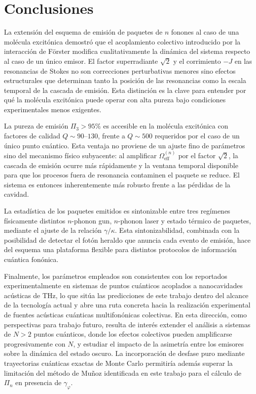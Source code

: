 \chapter{Conclusiones}

La extensión del esquema de emisión de paquetes de $n$ fonones al caso de una molécula excitónica demostró que el acoplamiento colectivo introducido por la interacción de Förster modifica cualitativamente la dinámica del sistema respecto al caso de un único emisor. El factor superradiante $\sqrt{2}$ y el corrimiento $-J$ en las resonancias de Stokes no son correcciones perturbativas menores sino efectos estructurales que determinan tanto la posición de las resonancias como la escala temporal de la cascada de emisión. Esta distinción es la clave para entender por qué la molécula excitónica puede operar con alta pureza bajo condiciones experimentales menos exigentes.

La pureza de emisión $\Pi_3 > 95\%$ es accesible en la molécula excitónica con factores de calidad $Q \sim 90$--$130$, frente a $Q \sim 500$ requeridos por el caso de un único punto cuántico. Esta ventaja no proviene de un ajuste fino de parámetros sino del mecanismo físico subyacente: al amplificar $\Omega_\mathrm{eff}^{(n)}$ por el factor $\sqrt{2}$, la cascada de emisión ocurre más rápidamente y la ventana temporal disponible para que los procesos fuera de resonancia contaminen el paquete se reduce. El sistema es entonces inherentemente más robusto frente a las pérdidas de la cavidad.

La estadística de los paquetes emitidos es sintonizable entre tres regímenes físicamente distintos $n$-phonon gun, $n$-phonon laser y estado térmico de paquetes, mediante el ajuste de la relación $\gamma/\kappa$. Esta sintonizabilidad, combinada con la posibilidad de detectar el fotón heraldo que anuncia cada evento de emisión, hace del esquema una plataforma flexible para distintos protocolos de información cuántica fonónica.

Finalmente, los parámetros empleados son consistentes con los reportados experimentalmente en sistemas de puntos cuánticos acoplados a nanocavidades acústicas de THz, lo que sitúa las predicciones de este trabajo dentro del alcance de la tecnología actual y abre una ruta concreta hacia la realización experimental de fuentes acústicas cuánticas multifonónicas colectivas. En esta dirección, como perspectivas para trabajo futuro, resulta de interés extender el análisis a sistemas de $N > 2$ puntos cuánticos, donde los efectos colectivos pueden amplificarse progresivamente con $N$, y estudiar el impacto de la asimetría entre los emisores sobre la dinámica del estado oscuro. La incorporación de desfase puro mediante trayectorias cuánticas exactas de Monte Carlo permitiría además superar la limitación del método de Muñoz identificada en este trabajo para el cálculo de $\Pi_n$ en presencia de $\gamma_\varphi$.